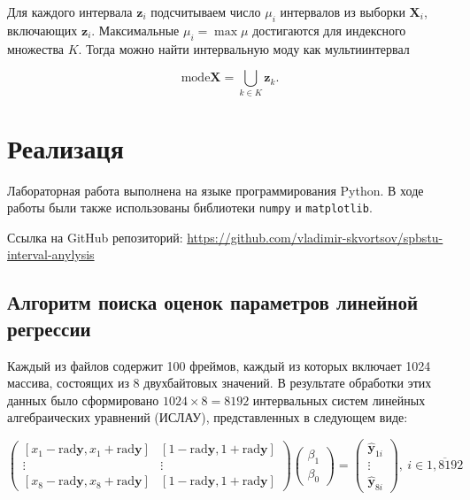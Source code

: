 \documentclass{article}
\begin{document}
  Для каждого интервала \( \mathbf{z}_i \) подсчитываем число \( \mu_i \)
  интервалов из выборки \( \mathbf{X}_i \), включающих \( \mathbf{z}_i \).
  Максимальные \( \mu_i = \max \mu \) достигаются для индексного множества
  \( K \). Тогда можно найти интервальную моду как мультиинтервал

  \begin{equation}
    \text{mode} \mathbf{X} = \bigcup_{k \in K} \mathbf{z}_k.
  \end{equation}

  \section{Реализаця}

  Лабораторная работа выполнена на языке программирования Python. В ходе
  работы были также использованы библиотеки \verb!numpy! и
  \verb!matplotlib!.

  Ссылка на GitHub репозиторий:
  \href{https://github.com/vladimir-skvortsov/spbstu-interval-anylysis}
  {https://github.com/vladimir-skvortsov/spbstu-interval-anylysis}

  \subsection{Алгоритм поиска оценок параметров линейной регрессии}

  Каждый из файлов содержит 100 фреймов, каждый из которых включает
  1024 массива, состоящих из 8 двухбайтовых значений. В результате
  обработки этих данных было сформировано \( 1024 \times 8 = 8192 \)
  интервальных систем линейных алгебраических уравнений (ИСЛАУ),
  представленных в следующем виде:

  \[
    \begin{pmatrix}
    [x_1 - \text{rad} \mathbf{y}, x_1 + \text{rad} \mathbf{y}] &
    [1 - \text{rad} \mathbf{y}, 1 + \text{rad} \mathbf{y}] \\
    \vdots & \vdots \\
    [x_8 - \text{rad} \mathbf{y}, x_8 + \text{rad} \mathbf{y}] &
    [1 - \text{rad} \mathbf{y}, 1 + \text{rad} \mathbf{y}]
    \end{pmatrix}
    \begin{pmatrix}
    \beta_1 \\
    \beta_0
    \end{pmatrix}
    = \begin{pmatrix}
    \hat{\mathbf{y}}_{1i} \\
    \vdots \\
    \hat{\mathbf{y}}_{8i}
    \end{pmatrix}, \ i \in \overline{1,8192}
  \]
\end{document}
